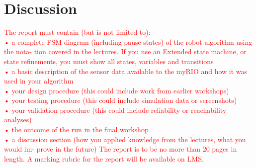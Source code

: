 \documentclass[11pt]{article}
\begin{document}
\section{Discussion}

\textcolor{red}{The report must contain (but is not limited to):\\
• a complete FSM diagram (including pause states) of the robot algorithm using the nota- tion covered in the lectures. If you use an Extended state machine, or state refinements, you must show all states, variables and transitions\\
• a basic description of the sensor data available to the myRIO and how it was used in your algorithm\\
• your design procedure (this could include work from earlier workshops)\\
• your testing procedure (this could include simulation data or screenshots)\\
• your validation procedure (this could include reliability or reachability analyses)\\
• the outcome of the run in the final workshop\\
• a discussion section (how you applied knowledge from the lectures, what you would im- prove in the future)
The report is to be no more than 20 pages in length. A marking rubric for the report will be available on LMS.
}
\end{document}
